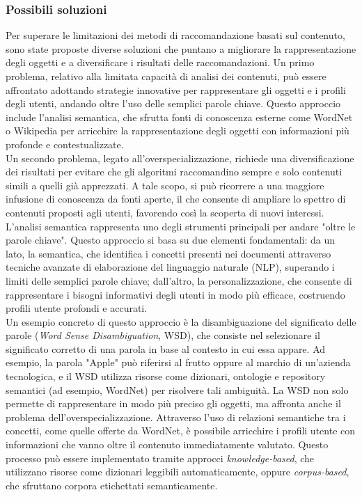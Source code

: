 \documentclass{report}
\begin{document}
	\subsubsection*{Possibili soluzioni}
	Per superare le limitazioni dei metodi di raccomandazione basati sul contenuto, sono state proposte diverse soluzioni che puntano a migliorare la rappresentazione degli oggetti e a diversificare i risultati delle raccomandazioni. Un primo problema, relativo alla limitata capacità di analisi dei contenuti, può essere affrontato adottando strategie innovative per rappresentare gli oggetti e i profili degli utenti, andando oltre l'uso delle semplici parole chiave. Questo approccio include l'analisi semantica, che sfrutta fonti di conoscenza esterne come WordNet o Wikipedia per arricchire la rappresentazione degli oggetti con informazioni più profonde e contestualizzate.  
	\vspace{\baselineskip}\\
	Un secondo problema, legato all'overspecializzazione, richiede una diversificazione dei risultati per evitare che gli algoritmi raccomandino sempre e solo contenuti simili a quelli già apprezzati. A tale scopo, si può ricorrere a una maggiore infusione di conoscenza da fonti aperte, il che consente di ampliare lo spettro di contenuti proposti agli utenti, favorendo così la scoperta di nuovi interessi. L'analisi semantica rappresenta uno degli strumenti principali per andare "oltre le parole chiave". Questo approccio si basa su due elementi fondamentali: da un lato, la semantica, che identifica i concetti presenti nei documenti attraverso tecniche avanzate di elaborazione del linguaggio naturale (NLP), superando i limiti delle semplici parole chiave; dall'altro, la personalizzazione, che consente di rappresentare i bisogni informativi degli utenti in modo più efficace, costruendo profili utente profondi e accurati.  
	\vspace{\baselineskip}\\
	Un esempio concreto di questo approccio è la disambiguazione del significato delle parole (\textit{Word Sense Disambiguation}, WSD), che consiste nel selezionare il significato corretto di una parola in base al contesto in cui essa appare. Ad esempio, la parola "Apple" può riferirsi al frutto oppure al marchio di un'azienda tecnologica, e il WSD utilizza risorse come dizionari, ontologie e repository semantici (ad esempio, WordNet) per risolvere tali ambiguità. La WSD non solo permette di rappresentare in modo più preciso gli oggetti, ma affronta anche il problema dell'overspecializzazione. Attraverso l’uso di relazioni semantiche tra i concetti, come quelle offerte da WordNet, è possibile arricchire i profili utente con informazioni che vanno oltre il contenuto immediatamente valutato. Questo processo può essere implementato tramite approcci \textit{knowledge-based}, che utilizzano risorse come dizionari leggibili automaticamente, oppure \textit{corpus-based}, che sfruttano corpora etichettati semanticamente.
	
\end{document}
